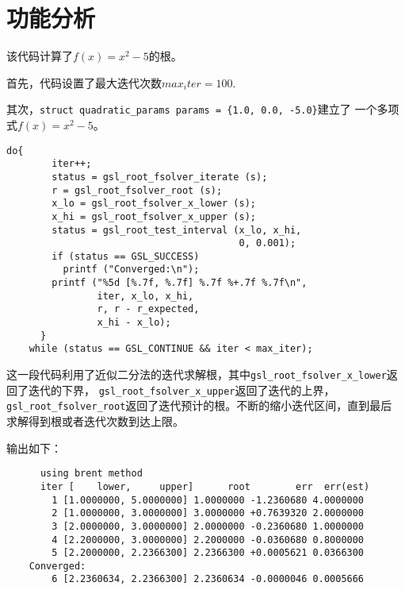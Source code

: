 \newpage
\section{功能分析}
该代码计算了$f(x)=x^2-5$的根。
\par 
首先，代码设置了最大迭代次数$max_iter=100$.
\par 
其次，\verb|struct quadratic_params params = {1.0, 0.0, -5.0}|建立了
一个多项式$f(x)=x^2-5$。

\lstset{language=c}
\begin{lstlisting}[caption = roots.c]
    do{
        iter++;
        status = gsl_root_fsolver_iterate (s);
        r = gsl_root_fsolver_root (s);
        x_lo = gsl_root_fsolver_x_lower (s);
        x_hi = gsl_root_fsolver_x_upper (s);
        status = gsl_root_test_interval (x_lo, x_hi,
                                         0, 0.001);
        if (status == GSL_SUCCESS)
          printf ("Converged:\n");
        printf ("%5d [%.7f, %.7f] %.7f %+.7f %.7f\n",
                iter, x_lo, x_hi,
                r, r - r_expected, 
                x_hi - x_lo);
      }
    while (status == GSL_CONTINUE && iter < max_iter);
\end{lstlisting}

这一段代码利用了近似二分法的迭代求解根，其中\verb|gsl_root_fsolver_x_lower|返回了迭代的下界，
\verb|gsl_root_fsolver_x_upper|返回了迭代的上界，
\verb|gsl_root_fsolver_root|返回了迭代预计的根。不断的缩小迭代区间，直到最后
求解得到根或者迭代次数到达上限。
\par 
输出如下：
\begin{verbatim}
      using brent method
      iter [    lower,     upper]      root        err  err(est)
        1 [1.0000000, 5.0000000] 1.0000000 -1.2360680 4.0000000
        2 [1.0000000, 3.0000000] 3.0000000 +0.7639320 2.0000000
        3 [2.0000000, 3.0000000] 2.0000000 -0.2360680 1.0000000
        4 [2.2000000, 3.0000000] 2.2000000 -0.0360680 0.8000000
        5 [2.2000000, 2.2366300] 2.2366300 +0.0005621 0.0366300
    Converged:
        6 [2.2360634, 2.2366300] 2.2360634 -0.0000046 0.0005666
\end{verbatim}